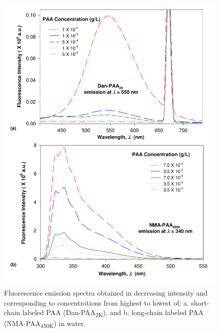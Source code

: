 \documentclass[twoside,twocolumn,9pt]{article}
\begin{document}
\begin{figure}[h]
\includegraphics[scale=0.47]{Figure4.pdf}
\caption{Fluorescence emission spectra obtained in
decreasing intensity and corresponding to concentrations from highest to lowest of: a. short-chain labeled PAA (Dan-PAA\textsubscript{2K}), and b. long-chain labeled PAA (NMA-PAA\textsubscript{450K}) in water.}
\label{figure 2}
\end{figure}
 
\end{document}

